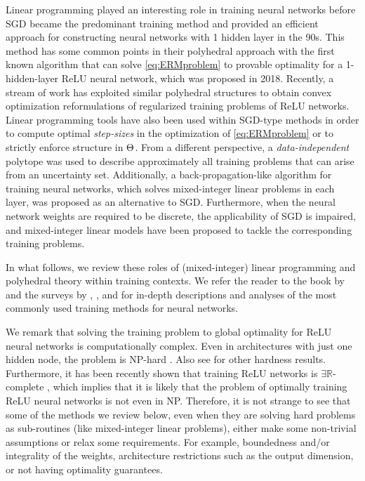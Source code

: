 Linear programming played an interesting role in training neural networks before SGD became the predominant training method and provided an efficient approach for constructing neural networks with 1 hidden layer in the 90s. This method has some common points in their polyhedral approach with the first known algorithm that can solve \eqref{eq:ERMproblem} to provable optimality for a 1-hidden-layer ReLU neural network, which was proposed in 2018. Recently, a stream of work has exploited similar polyhedral structures to obtain convex optimization reformulations of regularized training problems of ReLU networks. Linear programming tools have also been used within SGD-type methods in order to compute optimal \emph{step-sizes} in the optimization of \eqref{eq:ERMproblem} or to strictly enforce structure in $\Theta$. From a different perspective, a \emph{data-independent} polytope was used to describe approximately all training problems that can arise from an uncertainty set. Additionally, a back-propagation-like algorithm for training neural networks, which solves mixed-integer linear problems in each layer, was proposed as an alternative to SGD. Furthermore, when the neural network weights are required to be discrete, the applicability of SGD is impaired, and mixed-integer linear models have been proposed to tackle the corresponding training problems.

In what follows, we review these roles of (mixed-integer) linear programming and polyhedral theory within training contexts. We refer the reader to the book by \cite{goodfellow2016deep} and the surveys by \cite{curtis2017optimization}, \cite{bottou2018optimization}, and \cite{wright2018optimization} for in-depth descriptions and analyses of the most commonly used training methods for neural networks.

We remark that solving the training problem to global optimality for ReLU neural networks is computationally complex. Even in architectures with just one hidden node, the problem is NP-hard \citep{dey2020approximation,goel2021tight}. Also see \cite{blum1992training,boob2022complexity,chen2022learning,froese2022computational,froese2023training} for other hardness results. Furthermore, it has been recently shown that training ReLU networks is $\exists \mathbb{R}$-complete \citep{abrahamsen2021training,bertschinger2022training}, which implies that it is likely that the problem of optimally training ReLU neural networks is not even in NP. 
%
Therefore, it is not strange to see that some of the methods we review below, even when they are solving hard problems as sub-routines (like mixed-integer linear problems), either make some non-trivial assumptions or relax some requirements. For example, boundedness and/or integrality of the weights, architecture restrictions such as the output dimension, or not having optimality guarantees. 

